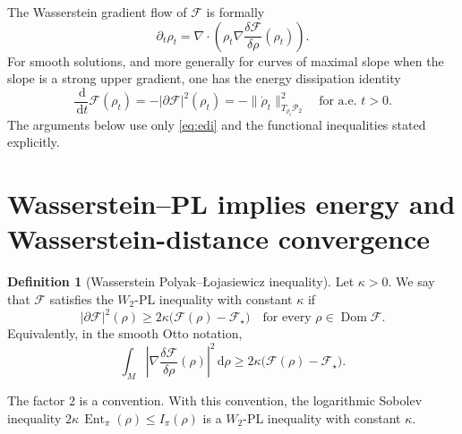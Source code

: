 \documentclass[11pt]{article}
\theoremstyle{definition}
\newtheorem{definition}[theorem]{Definition}
\DeclareMathOperator{\Ent}{Ent}
\newcommand{\Ptwo}{\mathcal P_2}
\newcommand{\F}{\mathcal F}
\newcommand{\W}{W_2}
\newcommand{\dd}{\,\mathrm d}
\begin{document}
The Wasserstein gradient flow of $\F$ is formally
\begin{equation}
        \partial_t\rho_t
        = \nabla\cdot\left(\rho_t\nabla\frac{\delta \F}{\delta\rho}(\rho_t)\right).
        \label{eq:wgf-pde}
\end{equation}
For smooth solutions, and more generally for curves of maximal slope when the slope is a strong upper gradient, one has the energy dissipation identity
\begin{equation}
        \frac{\dd}{\dd t}\F(\rho_t)
        = - |\partial \F|^2(\rho_t)
        = -\|\dot\rho_t\|_{T_{\rho_t}\Ptwo}^2
        \quad\text{for a.e. }t>0.
        \label{eq:edi}
\end{equation}
The arguments below use only \eqref{eq:edi} and the functional inequalities stated explicitly.

\section{Wasserstein--PL implies energy and Wasserstein-distance convergence}

\begin{definition}[Wasserstein Polyak--{\L}ojasiewicz inequality]
Let $\kappa>0$. We say that $\F$ satisfies the $\W$-PL inequality with constant $\kappa$ if
\begin{equation}
        |\partial \F|^2(\rho)
        \ge 2\kappa\bigl(\F(\rho)-\F_\star\bigr)
        \quad\text{for every }\rho\in \operatorname{Dom}\F.
        \label{eq:wpl}
\end{equation}
Equivalently, in the smooth Otto notation,
\begin{equation}
        \int_M \left|\nabla \frac{\delta \F}{\delta \rho}(\rho)\right|^2\dd \rho
        \ge 2\kappa\bigl(\F(\rho)-\F_\star\bigr).
        \label{eq:wpl-otto}
\end{equation}
\end{definition}

The factor $2$ is a convention. With this convention, the logarithmic Sobolev inequality
$2\kappa\,\Ent_\pi(\rho)\le I_\pi(\rho)$ is a $\W$-PL inequality with constant $\kappa$.
\end{document}
